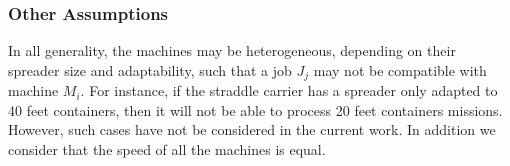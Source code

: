 \documentclass[a4paper,12pt]{article}
\begin{document}
%
%    
%
%
%
%
%
%
%
%
%
%
%
%      



\subsubsection{Other Assumptions}

In all generality, the machines may be heterogeneous, depending on their spreader size and adaptability, such that a job $J_j$ may not be compatible with machine $M_i$. For instance, if the straddle carrier has a spreader only adapted to 40 feet containers, then it will not be able to process 20 feet containers missions. However, such cases have not be considered in the current work. In addition we consider that the speed of all the machines is equal. \\
\end{document}

